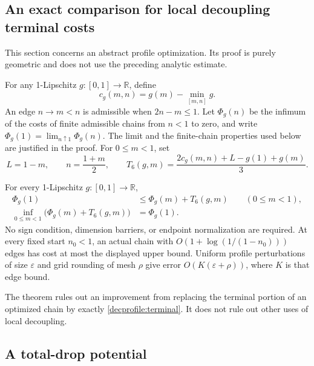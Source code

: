 \subsection{An exact comparison for local decoupling terminal costs}
\label{decprofile:statement}

This section concerns an abstract profile optimization. Its proof is purely
geometric and does not use the preceding analytic estimate.

For any 1-Lipschitz \(g:[0,1]\to\mathbb R\), define
\[
 c_g(m,n)=g(m)-\min_{[m,n]}g.
\]
An edge \(n\to m<n\) is admissible when \(2n-m\le1\).
Let \(\Phi_g(n)\) be the infimum of the costs of finite admissible chains
from \(n<1\) to zero, and write
\(\Phi_g(1)=\lim_{n\uparrow1}\Phi_g(n)\). The limit and the finite-chain
properties used below are justified in the proof.
For \(0\le m<1\), set
\begin{equation}\label{decprofile:terminal}
 L=1-m,\qquad n=\frac{1+m}{2},\qquad
 T_6(g,m)=\frac{2c_g(m,n)+L-g(1)+g(m)}3.
\end{equation}

\begin{theorem}
\label{decprofile:identity}
For every 1-Lipschitz \(g:[0,1]\to\mathbb R\),
\begin{equation}\label{decprofile:exact}
 \begin{aligned}
 \Phi_g(1)&\le\Phi_g(m)+T_6(g,m)\qquad(0\le m<1),\\
 \inf_{0\le m<1}\bigl(\Phi_g(m)+T_6(g,m)\bigr)&=\Phi_g(1).
 \end{aligned}
\end{equation}
No sign condition, dimension barriers, or endpoint normalization are
required. At every fixed start \(n_0<1\), an actual chain with
\(O(1+\log(1/(1-n_0)))\) edges has cost at most the displayed upper
bound. Uniform profile
perturbations of size \(\varepsilon\) and grid rounding of mesh \(\rho\)
give error \(O(K(\varepsilon+\rho))\), where \(K\) is that edge bound.
\end{theorem}

The theorem rules out an improvement from replacing the terminal portion
of an optimized chain by exactly \eqref{decprofile:terminal}. It does not
rule out other uses of local decoupling.

\subsection{A total-drop potential}
\label{decprofile:potential}

